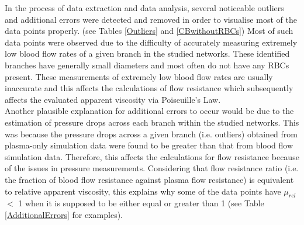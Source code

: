 
\noindent In the process of data extraction and data analysis, several noticeable outliers and additional errors were detected and removed in order to visualise most of the data points properly. (see Tables \ref{Outliers} and \ref{CBwithoutRBCs}) Most of such data points were observed due to the difficulty of accurately measuring extremely low blood flow rates of a given branch in the studied networks. These identified branches have generally small diameters and most often do not have any RBCs present. These measurements of extremely low blood flow rates are usually inaccurate and this affects the calculations of flow resistance which subsequently affects the evaluated apparent viscosity via Poiseuille's Law. \\

\noindent Another plausible explanation for additional errors to occur would be due to the estimation of pressure drops across each branch within the studied networks. This was because the pressure drops across a given branch (i.e. outliers) obtained from plasma-only simulation data were found to be greater than that from blood flow simulation data. Therefore, this affects the calculations for flow resistance because of the issues in pressure measurements. Considering that flow resistance ratio (i.e. the fraction of blood flow resistance against plasma flow resistance) is equivalent to relative apparent viscosity, this explains why some of the data points have $\mu_{rel}$ $<$ 1 when it is supposed to be either equal or greater than 1 (see Table \ref{AdditionalErrors} for examples). 

